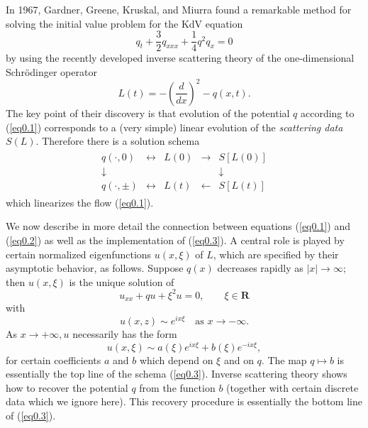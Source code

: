 \documentclass{surv-l}
\theoremstyle{plain}
\theoremstyle{definition}
\numberwithin{equation}{chapter}
\begin{document}
In 1967, Gardner, Greene, Kruskal, and Miurra \cite{GGKM} found a remarkable method for solving the initial value problem for the KdV equation
\begin{equation}\label{eq0.1}
q_{t}+\frac{3}{2}q_{xxx}+\frac{1}{4}q^{2}q_{x}=0
\end{equation}
by using the recently developed inverse scattering theory of the one-dimensional Schr\"{o}dinger operator
\begin{equation}\label{eq0.2}
L(t)=-\left(\frac{d}{dx}\right)^{2}-q(x,t).
\end{equation}
The key point of their discovery is that evolution of the potential $q$ according to (\ref{eq0.1}) corresponds to a (very simple) linear evolution of the \emph{scattering data} $S(L)$. Therefore there is a solution schema
\begin{align}\label{eq0.3}
  \begin{array}{ccccc}
    q(\cdot, 0) & \leftrightarrow & L(0) & \rightarrow & S[L(0)] \\
    \downarrow &  &  &  & \downarrow \\
    q(\cdot, \pm) & \leftrightarrow & L(t) & \leftarrow & S[L(t)]
  \end{array}
\end{align}
which linearizes the flow (\ref{eq0.1}).

We now describe in more detail the connection between equations (\ref{eq0.1}) and (\ref{eq0.2}) as well as the implementation of (\ref{eq0.3}). A central role is played by certain normalized eigenfunctions $u(x, \xi)$ of $L$, which are specified by their asymptotic behavior, as follows. Suppose $q(x)$ decreases rapidly as $|x|\rightarrow\infty$; then $u(x, \xi)$ is the unique solution of
\begin{equation}\label{eq0.4}
u_{xx}+qu+\xi^{2}u=0,\qquad \xi\in \textbf{R}
\end{equation}
with
\begin{equation*}
u(x,z)\sim e^{i x\xi}\quad \text{as }  x\rightarrow-\infty.
\end{equation*}
As $x\rightarrow+\infty, u$ necessarily has the form
\begin{equation}\label{eq0.5}
u(x, \xi)\sim a(\xi)e^{ix\xi}+b(\xi)e^{-ix\xi},
\end{equation}
for certain coefficients $a$ and $b$ which depend on $\xi$ and on $q$. The map $q\mapsto b$ is essentially the top line of the schema (\ref{eq0.3}). Inverse scattering theory shows how to recover the potential $q$ from the function $b$ (together with certain discrete data which we ignore here). This recovery procedure is essentially the bottom line of (\ref{eq0.3}).
\end{document}
